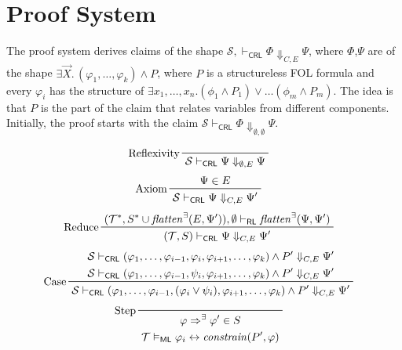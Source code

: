 \documentclass{article}
\newcommand{\RL}{\mathsf{RL}}
\newcommand{\ML}{\mathsf{ML}}
\newcommand{\CRL}{\mathsf{CRL}}
\begin{document}
\section{Proof System}

The proof system derives claims of the shape
$\mathcal{S}, \vdash_\CRL \Phi \Downarrow_{C,E} \Psi$,
where $\Phi$,$\Psi$ are of the shape
$\exists \vec{X}.\, (\varphi_1, \ldots, \varphi_k) \land P$,
where $P$ is a structureless FOL formula
and every $\varphi_i$ has the structure of
$\exists x_1,\ldots,x_n. (\phi_1 \land P_1) \lor \ldots (\phi_m \land P_m)$.
The idea is that $P$ is the part of the claim that relates variables from different components.
Initially, the proof starts with the claim
$\mathcal{S} \vdash_\CRL \Phi \Downarrow_{\emptyset, \emptyset} \Psi$.


\begin{figure}
    \centering
    \begin{align*}
    & \prftree[l]{Reflexivity}{\mathcal{S} \vdash_\CRL \Psi \Downarrow_{\emptyset,E} \Psi}
    \end{align*}
    \begin{align*}
    & \prftree[l]{Axiom}{\Psi \in E}{\mathcal{S} \vdash_\CRL \Psi \Downarrow_{C,E} \Psi^\prime}
    \end{align*}
    \begin{align*}
    & \prftree[l]{Reduce}
      {(\mathcal{T}^*, S^* \cup \mathit{flatten}^\exists(E, \Psi^\prime)), \emptyset \vdash_\RL
        \mathit{flatten}^\exists(\Psi, \Psi^\prime) }
      {(\mathcal{T}, S) \vdash_\CRL \Psi \Downarrow_{C,E} \Psi^\prime}
    \end{align*}
    \begin{align*}
    & \prftree[l]{Case}
    { \prfStackPremises
      {\mathcal{S} \vdash_\CRL (\varphi_1, \ldots, \varphi_{i-1}, \varphi_i, \varphi_{i+1}, \ldots, \varphi_k) \land P^\prime \Downarrow_{C, E} \Psi^\prime }
      {\mathcal{S} \vdash_\CRL (\varphi_1, \ldots, \varphi_{i-1}, \psi_i, \varphi_{i+1}, \ldots, \varphi_k) \land P^\prime \Downarrow_{C, E} \Psi^\prime }
    }
    {\mathcal{S} \vdash_\CRL (\varphi_1, \ldots, \varphi_{i-1}, (\varphi_i \lor \psi_i), \varphi_{i+1}, \ldots, \varphi_k) \land P^\prime \Downarrow_{C, E} \Psi^\prime}
    \end{align*}
    \begin{align*}
    & \prftree[l]{Step}
    { \prfStackPremises
       {\varphi \Rightarrow^\exists \varphi^\prime \in S}
       {\mathcal{T} \vDash_\ML \varphi_i \leftrightarrow \mathit{constrain}(P^\prime, \varphi)}
}
\end{align*}
\end{figure}
\end{document}
